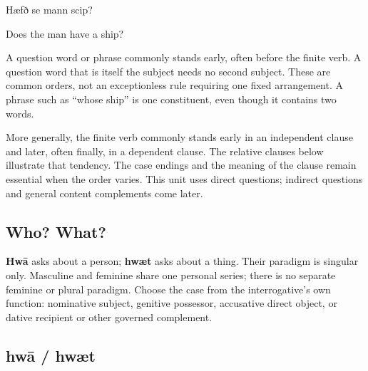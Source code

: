 Hæfð se mann scip?

Does the man have a ship?

A question word or phrase commonly stands early, often before the finite verb. A question word that is itself the subject needs no second subject. These are common orders, not an exceptionless rule requiring one fixed arrangement. A phrase such as “whose ship” is one constituent, even though it contains two words.

More generally, the finite verb commonly stands early in an independent clause and later, often finally, in a dependent clause. The relative clauses below illustrate that tendency. The case endings and the meaning of the clause remain essential when the order varies. This unit uses direct questions; indirect questions and general content complements come later.

\subsection*{Who? What?}

\textbf{Hwā} asks about a person; \textbf{hwæt} asks about a thing. Their paradigm is singular only. Masculine and feminine share one personal series; there is no separate feminine or plural paradigm. Choose the case from the interrogative’s own function: nominative subject, genitive possessor, accusative direct object, or dative recipient or other governed complement.

\subsection*{hwā /\allowbreak{} hwæt}

